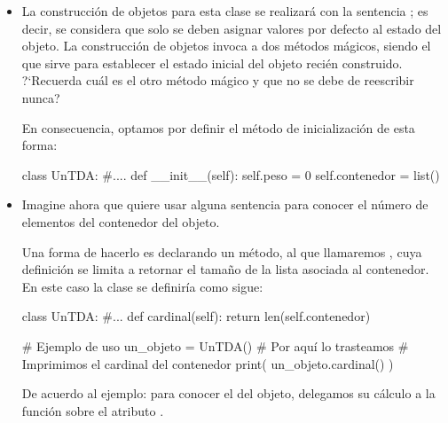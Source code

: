 \begin{itemize}
\item La construcción de objetos para esta clase se realizará con la sentencia ; es decir, se considera que solo se deben asignar valores por defecto al estado del objeto. La construcción de objetos invoca a dos métodos mágicos, siendo  el que sirve para establecer el estado inicial del objeto recién construido. ?`Recuerda cuál es el otro método mágico y que no se debe de reescribir nunca?  

En consecuencia, optamos por definir el método de inicialización de esta forma:

\hfil
\begin{minipage}{.4\textwidth}
\begin{pyconsole}[][frame=single]
class UnTDA:
   #....
   def __init__(self):
     self.peso = 0
     self.contenedor = list()

\end{pyconsole}
\end{minipage}


\item Imagine ahora que quiere usar alguna sentencia para conocer el número de elementos del contenedor del objeto.

Una forma de hacerlo es declarando un método, al que llamaremos , cuya definición se limita a retornar el tamaño de la lista asociada al contenedor. En este caso la clase se definiría como sigue:

\hfil
\begin{minipage}{.45\textwidth}
\begin{pyconsole}[][frame=single]
class UnTDA:
   #...
   def cardinal(self):
     return len(self.contenedor)

\end{pyconsole}
\end{minipage}
\begin{minipage}{.45\textwidth}
\begin{pyverbatim}[][frame=single]
# Ejemplo de uso
un_objeto = UnTDA()
# Por aquí lo trasteamos
# Imprimimos el cardinal del contenedor
print( un_objeto.cardinal() )
\end{pyverbatim}
\end{minipage}


De acuerdo al ejemplo: para conocer el  del objeto, delegamos su cálculo a la función  sobre el atributo .



\end{itemize}
